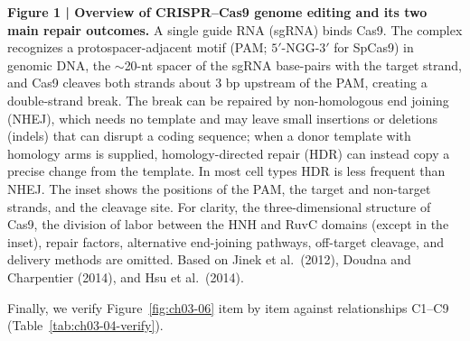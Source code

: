 \begin{BookNote}
\textbf{Figure 1 | Overview of CRISPR--Cas9 genome editing and its two main repair outcomes.} A single guide RNA (sgRNA) binds Cas9. The complex recognizes a protospacer-adjacent motif (PAM; $5'$-NGG-$3'$ for SpCas9) in genomic DNA, the $\sim$20-nt spacer of the sgRNA base-pairs with the target strand, and Cas9 cleaves both strands about 3 bp upstream of the PAM, creating a double-strand break. The break can be repaired by non-homologous end joining (NHEJ), which needs no template and may leave small insertions or deletions (indels) that can disrupt a coding sequence; when a donor template with homology arms is supplied, homology-directed repair (HDR) can instead copy a precise change from the template. In most cell types HDR is less frequent than NHEJ. The inset shows the positions of the PAM, the target and non-target strands, and the cleavage site. For clarity, the three-dimensional structure of Cas9, the division of labor between the HNH and RuvC domains (except in the inset), repair factors, alternative end-joining pathways, off-target cleavage, and delivery methods are omitted. Based on Jinek et al.\ (2012), Doudna and Charpentier (2014), and Hsu et al.\ (2014).
\end{BookNote}

Finally, we verify Figure~\ref{fig:ch03-06} item by item against relationships C1--C9 (Table~\ref{tab:ch03-04-verify}).

